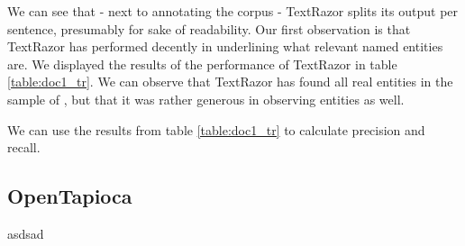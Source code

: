 \documentclass[a4paper, 11pt]{article}
\begin{document}
We can see that - next to annotating the corpus - TextRazor splits its output per sentence, presumably for sake of readability. Our first observation is that TextRazor has performed  decently in underlining what relevant named entities are. We displayed the results of the performance of TextRazor in table \ref{table:doc1_tr}. We can observe that TextRazor has found all real entities in the sample of \citet{mcgee_2020}, but that it was rather generous in observing entities as well.

\begin{table}[h]
	\centering
\caption{Performance report of TextRazor analyzing the \citet{mcgee_2020} sample.}
\label{table:doc1_tr}
\end{table}

We can use the results from table \ref{table:doc1_tr} to calculate precision and recall.

\subsection{OpenTapioca}

asdsad



\end{document}
